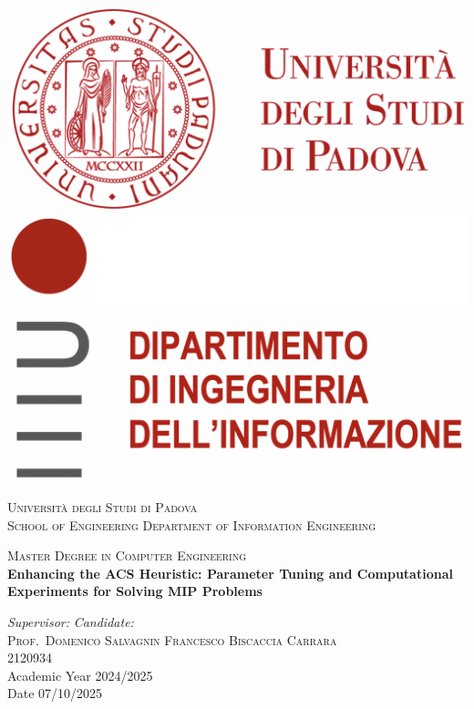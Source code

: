 \documentclass[a4paper,12pt,ì]{report}
\begin{document}
\begin{titlepage}
\begin{center}

\includegraphics[height=0.13\textheight]{logo_unipd.png}
\hfill
\includegraphics[height=0.13\textheight]{logo_dei.png}
\newline
\newline

\vspace{0.8cm}
\textsc{\LARGE Universit\`{a} degli Studi di Padova}\\
\vspace{1.6cm}
\textsc{\large School of Engineering Department of Information Engineering}\\
\vspace{0.4cm}

\textsc{\large Master Degree in Computer Engineering}\\
\vfill
{ \LARGE \bfseries Enhancing the ACS Heuristic: Parameter Tuning and Computational Experiments for Solving MIP Problems}\\
\vfill

\textit{\large Supervisor:} \hfill \textit{\large Candidate:}\\
\textsc{\large Prof.\ Domenico Salvagnin} \hfill \textsc{Francesco Biscaccia Carrara}\\
\textit{\large {}} \hfill \textsc{2120934}\\

\vfill
{\large Academic Year 2024/2025}\\
{Date 07/10/2025} 
\end{center}
\end{titlepage}
\end{document}

